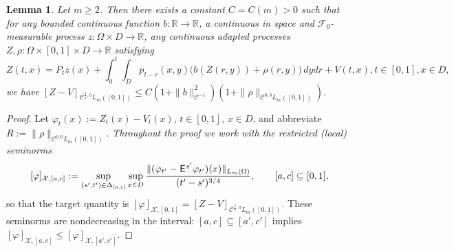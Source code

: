 \documentclass[12pt]{article}
\newtheorem{lemma}[theorem]{Lemma}
\theoremstyle{definition}
\DeclareMathOperator{\1}{\mathbbm{1}}%
\def\E{\hskip.15ex\mathsf{E}\hskip.10ex}
\def\phi{\varphi}
\renewcommand{\ge}{\geqslant}
\renewcommand{\le}{\leqslant}
\newcommand{\C}{\mathcal{C}}
\newcommand{\F}{\mathcal{F}}
\newcommand{\R}{\mathbb{R}}
\newcommand{\X}{\mathcal{X}}
\begin{document}
\begin{lemma}\label{l:apriori}
Let $m\ge2$.  Then there exists a constant $C=C(m)>0$ such that for
any bounded continuous function $b\colon\R\to\R$, a continuous in
space and  $\F_0$-measurable process $z\colon\Omega\times D\to\R$, any  continuous adapted processes $Z,\rho\colon\Omega\times[0,1]\times D\to\R$ satisfying 
\begin{equation*}%
Z(t,x)=P_t z(x)+ \int_0^t \int_{D} p_{t-r}(x,y)\bigl(b(Z(r,y))+ \rho(r,y)\bigr)\,dydr + V(t,x), t\in[0,1], x\in D, 
\end{equation*}
we have 
$[Z-V]_{\C^{\frac34,0}L_m([0,1])}\le  C (1+\|b\|_{\C^{-1}}^2)(1+\|\rho\|_{ \C^{0,0}L_m([0,1])})$. 
\end{lemma}	

\begin{proof}
Let $\phi_t(x):=Z_t(x)-V_t(x)$, $t\in[0,1]$, $x\in D$, and abbreviate
$R:=\|\rho\|_{\C^{0,0}L_m([0,1])}$. \emph{Throughout the proof we work with the
restricted (local) seminorms}
\[
[\phi]_{\X,[a,c]}:=\sup_{(s',t')\in\Delta_{[a,c]}}\sup_{x\in D}
\frac{\|(\phi_{t'}-\E^{s'}\phi_{t'})(x)\|_{L_m(\Omega)}}{(t'-s')^{3/4}},
\qquad [a,c]\subseteq[0,1],
\]
so that the target quantity is $[\phi]_{\X,[0,1]}=[Z-V]_{\C^{\frac34,0}L_m([0,1])}$.
These seminorms are nondecreasing in the interval: $[a,c]\subseteq[a',c']$ implies
$[\phi]_{\X,[a,c]}\le[\phi]_{\X,[a',c']}$.


\end{proof}
\end{document}
